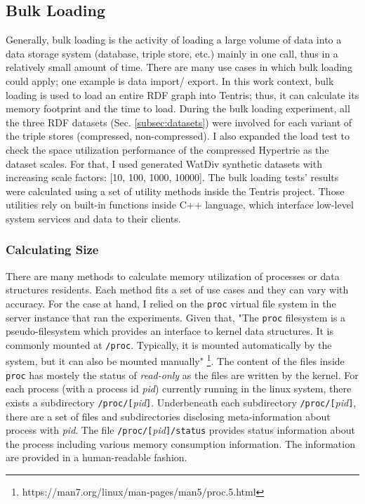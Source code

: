 \subsection{Bulk Loading} 
Generally, bulk loading is the activity of loading a large volume of data into a data storage system (database, triple store, etc.) mainly in one call, thus in a relatively small amount of time. 
There are many use cases in which bulk loading could apply; one example is data import/ export.
In this work context, bulk loading is used to load an entire RDF graph into Tentris; thus, it can calculate its memory footprint and the time to load.
During the bulk loading experiment, all the three RDF datasets (Sec. \ref{subsec:datasets}) were involved for each variant of the triple stores (compressed, non-compressed).
I also expanded the load test to check the space utilization performance of the compressed Hypertrie as the dataset scales.
For that, I used generated WatDiv synthetic datasets with increasing scale factors: [10, 100, 1000, 10000]. 
The bulk loading tests' results were calculated using a set of utility methods inside the Tentris project. Those utilities rely on built-in functions inside C++ language, which interface low-level system services and data to their clients.

\subsubsection{Calculating Size}
There are many methods to calculate memory utilization of processes or data structures residents. 
Each method fits a set of use cases and they can vary with accuracy.
For the case at hand, I relied on the \verb|proc| virtual file system in the server instance that ran the experiments. Given that, "The \verb|proc| filesystem is a pseudo-filesystem which provides an
interface to kernel data structures.  It is commonly mounted at
\verb|/proc|.  
Typically, it is mounted automatically by the system, but it can also be mounted manually" \footnote{https://man7.org/linux/man-pages/man5/proc.5.html}. The content of the files inside \verb|proc| has mostely the status of \textit{read-only} as the files are written by the kernel. 
For each process (with a process id \textit{pid}) currently running in the linux system, there exists a subdirectory \verb|/proc/[|\textit{pid}\verb|]|. 
Underbeneath each subdirectory \verb|/proc/[|\textit{pid}\verb|]|, there are a set of files and subdirectories disclosing meta-information about process with \textit{pid}. The file \verb|/proc/[|\textit{pid}\verb|]/status| provides status information about the process including various memory consumption information. The information are provided in a human-readable fashion. \\

